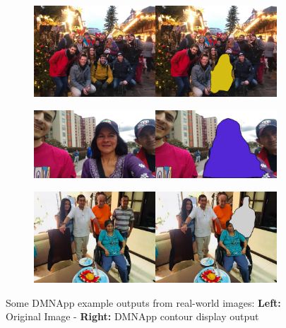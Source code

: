 \begin{figure}[!htbp]
    \ContinuedFloat
    \centering
    \begin{subfigure}[b]{\columnwidth}
            \centering
            \includegraphics[width=\textwidth]{./figures/dmn_app/samples/1.jpg}
    \end{subfigure}
    
    \begin{subfigure}[b]{\columnwidth}
            \centering
            \includegraphics[width=\textwidth]{./figures/dmn_app/samples/5.png}
    \end{subfigure}
    
    \begin{subfigure}[b]{\columnwidth}
            \centering
            \includegraphics[width=\textwidth]{./figures/dmn_app/samples/8.png}
    \end{subfigure}
    \caption{Some DMNApp example outputs from real-world images: \textbf{Left:} Original Image - \textbf{Right:} DMNApp contour display output}
    \label{Fig:App_Examples}
\end{figure}

